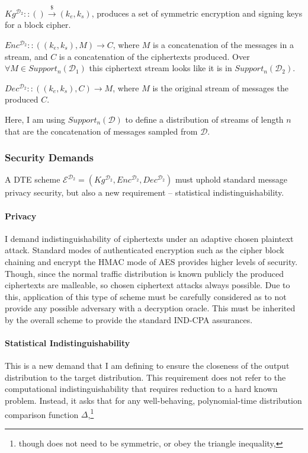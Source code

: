 \documentclass[ %
                    author={Samuel Russell},
                supervisor={Prof. Bogdan Warinschi},
                    degree={MEng},
                     title={Innocuous Ciphertexts},
                  subtitle={The DE-CENSOR Scheme},
                      type={Research},
                      year={2018} ]{dissertation}
\begin{document}
$Kg^{\mathcal{D}_2} :: () \xrightarrow{\$} (k_e,k_s)$, produces a set of symmetric encryption and signing keys for a block cipher.

$Enc^{\mathcal{D}_2} :: ((k_e,k_s), M) \rightarrow C$, where $M$ is a concatenation of the messages in a stream, and $C$ is a concatenation of the ciphertexts produced. Over $\forall M \in Support_n(\mathcal{D}_1)$ this ciphertext stream looks like it is in  $Support_n(\mathcal{D}_2)$.

$Dec^{\mathcal{D}_2} :: ((k_e,k_s), C) \rightarrow M$, where $M$ is the original stream of messages the produced $C$.

Here, I am using $Support_n(\mathcal{D})$ to define a distribution of streams of length $n$ that are the concatenation of messages sampled from $\mathcal{D}$.

\subsubsection{Security Demands}

A DTE scheme $\mathcal{E}^{\mathcal{D}_2} = (Kg^{\mathcal{D}_2}, Enc^{\mathcal{D}_2}, Dec^{\mathcal{D}_2})$ must uphold standard message privacy security, but also a new requirement -- statistical indistinguishability.

\paragraph{Privacy}

I demand indistinguishability of ciphertexts under an adaptive chosen plaintext attack. Standard modes of authenticated encryption such as the cipher block chaining and encrypt the HMAC mode of AES provides higher levels of security.
Though, since the normal traffic distribution is known publicly the produced ciphertexts are malleable, so chosen ciphertext attacks always possible.
Due to this, application of this type of scheme must be carefully considered as to not provide any possible adversary with a decryption oracle.
This must be inherited by the overall scheme to provide the standard IND-CPA assurances.

\paragraph{Statistical Indistinguishability}

This is a new demand that I am defining to ensure the closeness of the output distribution to the target distribution.
This requirement does not refer to the computational indistinguishability that requires reduction to a hard known problem.
Instead, it asks that for any well-behaving, polynomial-time distribution comparison function $\Delta$,\footnote{though does not need to be symmetric, or obey the triangle inequality,}
\end{document}
